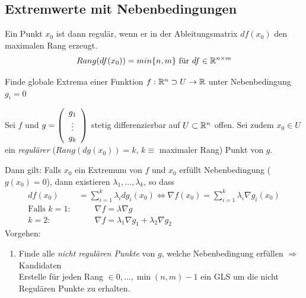 \documentclass[a4paper]{article}
\begin{document}
	\subsection{Extremwerte mit Nebenbedingungen}
		\begin{fdef}
			Ein Punkt $x_0$ ist dann regulär, wenn er in der Ableitungsmatrix $df(x_0)$ den maximalen Rang erzeugt.
			\begin{align*}
				Rang(df(x_0)) = min\{n,m\} \text{ für } df \in \mathbb{R}^{n \times m}
			\end{align*}
		\end{fdef}

		Finde globale Extrema einer Funktion  $f:\mathbb{R}^n \supset U \rightarrow \mathbb{R}$ unter Nebenbedingung $g_i = 0$
		\begin{fsatz}
			Sei $f$ und $g= \left( \begin{array}{c} g_1\\ \vdots \\g_k  \end{array} \right)$ stetig differenzierbar auf $U \subset \mathbb{R}^n$ offen. Sei zudem $x_0 \in U$ ein \emph{regulärer} ($Rang(dg(x_0))=k$, $k \equiv $ maximaler Rang) Punkt von $g$. 
			
			Dann gilt: Falls $x_0$ ein Extremum von $f$ und $x_0$ erfüllt Nebenbedingung ($g(x_0)=0$), dann existieren $\lambda_1, \ldots, \lambda_k$, so dass 
			\begin{align*}
				df(x_0)&=\sum_{i=1}^k \lambda_i dg_i (x_0) \Longleftrightarrow \nabla f (x_0) = \sum_{i=1}^k \lambda_i \nabla g_i (x_0)\\
				\text{Falls } k = 1: & \qquad \nabla f = \lambda \nabla g\\
							  k = 2: & \qquad \nabla f = \lambda_1 \nabla g_1 + \lambda_2 \nabla g_2
			\end{align*}
			Vorgehen:
			\begin{enumerate}
				\item Finde alle \emph{nicht regulären Punkte} von $g$, welche Nebenbedingung erfüllen $\Rightarrow$ Kandidaten \\
					Erstelle für jeden Rang $\in {0,\ldots, \min(n,m)-1}$ ein GLS um die nicht Regulären Punkte zu erhalten.
					

\end{enumerate}
\end{fsatz}
\end{document}
